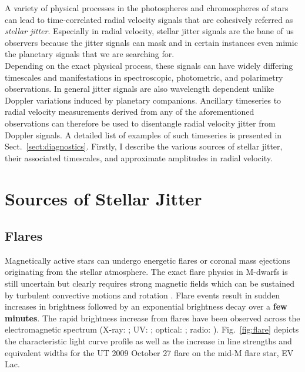 A variety of physical processes in the photospheres and chromospheres of stars 
can lead to time-correlated radial velocity signals that are cohesively 
referred as \emph{stellar jitter}. Especially in radial velocity, stellar jitter 
signals are the bane of us observers because the jitter signals can mask and 
in certain instances even mimic the planetary signals that we are searching for. \\

Depending on the exact physical process, these 
signals can have widely differing timescales and manifestations in 
spectroscopic, photometric, and polarimetry observations. In general jitter 
signals are also wavelength dependent unlike Doppler variations induced by 
planetary companions. Ancillary timeseries to radial velocity measurements 
derived from any of the aforementioned observations can therefore be used to 
disentangle radial velocity jitter from Doppler signals. A detailed list 
of examples of such timeseries is presented in Sect.~\ref{sect:diagnostics}. 
Firstly, I describe the various 
sources of stellar jitter, their associated timescales, and approximate 
amplitudes in radial velocity. 

\section{Sources of Stellar Jitter} \label{sect:jitter}
\subsection{Flares}
Magnetically active stars can undergo energetic flares or coronal mass 
ejections originating from the stellar atmosphere. The exact flare physics 
in M-dwarfs is still uncertain but clearly requires strong magnetic fields 
which can be sustained by turbulent convective motions and rotation 
\parencite{browning08}. Flare events result in sudden increases in brightness 
followed by an exponential brightness decay over a \textbf{few minutes}. The rapid 
brightness increase from flares have been observed across the electromagnetic 
spectrum (X-ray: \cite{osten10}; UV: \cite{hawley07}; optical: 
\cite{kowalski09}; radio: \cite{osten08}). Fig.~\ref{fig:flare} depicts the 
characteristic light curve profile as well as the 
increase in line strengths and equivalent 
widths for the UT 2009 October 27 flare on the mid-M flare star, EV Lac. \\

